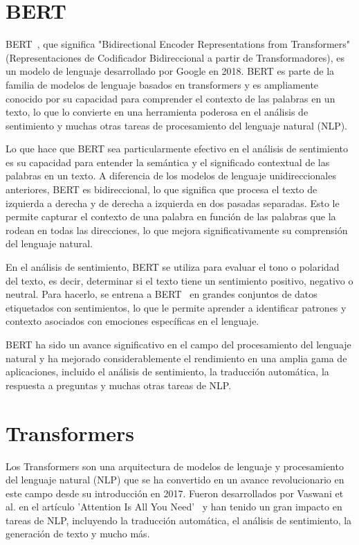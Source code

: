 
\section{BERT}

BERT~\cite{devlin2019bert}, que significa "Bidirectional Encoder Representations from Transformers" (Representaciones de Codificador Bidireccional a partir de Transformadores), es un modelo de lenguaje desarrollado por Google en 2018. BERT es parte de la familia de modelos de lenguaje basados en transformers y es ampliamente conocido por su capacidad para comprender el contexto de las palabras en un texto, lo que lo convierte en una herramienta poderosa en el análisis de sentimiento y muchas otras tareas de procesamiento del lenguaje natural (NLP).

Lo que hace que BERT sea particularmente efectivo en el análisis de sentimiento es su capacidad para entender la semántica y el significado contextual de las palabras en un texto. A diferencia de los modelos de lenguaje unidireccionales anteriores, BERT es bidireccional, lo que significa que procesa el texto de izquierda a derecha y de derecha a izquierda en dos pasadas separadas. Esto le permite capturar el contexto de una palabra en función de las palabras que la rodean en todas las direcciones, lo que mejora significativamente su comprensión del lenguaje natural.

En el análisis de sentimiento, BERT se utiliza para evaluar el tono o polaridad del texto, es decir, determinar si el texto tiene un sentimiento positivo, negativo o neutral. Para hacerlo, se entrena a BERT~\cite{BertSentimentModel1} en grandes conjuntos de datos etiquetados con sentimientos, lo que le permite aprender a identificar patrones y contexto asociados con emociones específicas en el lenguaje.

BERT ha sido un avance significativo en el campo del procesamiento del lenguaje natural y ha mejorado considerablemente el rendimiento en una amplia gama de aplicaciones, incluido el análisis de sentimiento, la traducción automática, la respuesta a preguntas y muchas otras tareas de NLP.


\section{Transformers}

Los Transformers son una arquitectura de modelos de lenguaje y procesamiento del lenguaje natural (NLP)
que se ha convertido en un avance revolucionario en este campo desde su introducción en 2017.
Fueron desarrollados por Vaswani et al. en el artículo 'Attention Is All You Need'~\cite{vaswani2023attention} 
y han tenido un gran impacto en tareas de NLP, incluyendo la traducción automática, el análisis de sentimiento, la generación de texto y mucho más.

